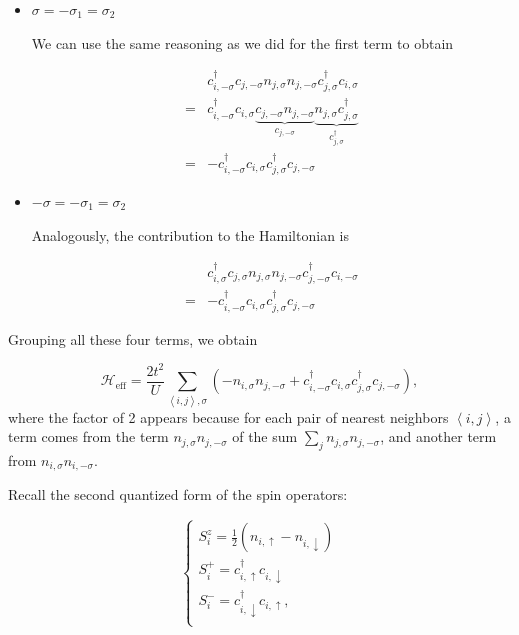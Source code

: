 \begin{itemize}
\item $\sigma = - \sigma_1 = \sigma_2$

We can use the same reasoning as we did for the first term to obtain

\begin{equation*}
\begin{split}
&c_{i,-\sigma}^\dagger c_{j,-\sigma} n_{j,\sigma} n_{j, -\sigma} c_{j, \sigma}^\dagger c_{i, \sigma} \\
=& c_{i, -\sigma}^\dagger c_{i,\sigma} \underbrace{c_{j,-\sigma} n_{j, -\sigma}}_{c_{j,-\sigma}} \underbrace{n_{j, \sigma} c_{j, \sigma}^\dagger}_{c_{j,\sigma}^\dagger} \\
=& - c_{i, -\sigma}^\dagger c_{i,\sigma} c_{j, \sigma}^\dagger c_{j,-\sigma}
\end{split}
\end{equation*}

\item $-\sigma = - \sigma_1 = \sigma_2$

Analogously, the contribution to the Hamiltonian is

\begin{equation*}
\begin{split}
&c_{i,\sigma}^\dagger c_{j,\sigma} n_{j,\sigma} n_{j, -\sigma} c_{j, -\sigma}^\dagger c_{i, -\sigma} \\
=& - c_{i, -\sigma}^\dagger c_{i,\sigma} c_{j, \sigma}^\dagger c_{j,-\sigma}
\end{split}
\end{equation*}

\end{itemize}

Grouping all these four terms, we obtain

\begin{equation}
\mathcal{H}_{\text{eff}} = \frac{2t^2}{U} \sum_{\left\langle i, j \right\rangle, \sigma} ( - n_{i,\sigma} n_{j,-\sigma} + c_{i,-\sigma}^\dagger c_{i,\sigma} c_{j,\sigma}^\dagger c_{j,-\sigma} ) ,
\end{equation}
where the factor of 2 appears because for each pair of nearest neighbors $\left\langle i, j \right\rangle$, a term comes from the term $n_{j,\sigma} n_{j,-\sigma}$ of the sum $\sum_j n_{j,\sigma} n_{j,-\sigma}$, and another term from $n_{i,\sigma} n_{i,-\sigma}$.

Recall the second quantized form of the spin operators:

\begin{equation}
\begin{cases}
S_i^z = \frac{1}{2} ( n_{i,\uparrow} - n_{i,\downarrow} ) \\
S_i^+ = c_{i,\uparrow}^\dagger c_{i,\downarrow} \\
S_i^- = c_{i,\downarrow}^\dagger c_{i,\uparrow}, \\
\end{cases}
\end{equation}


